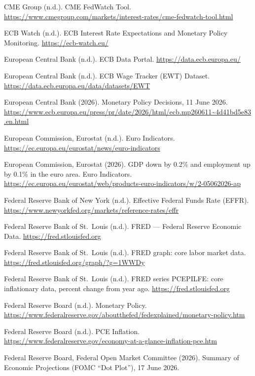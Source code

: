 \documentclass[11pt,a4paper]{article}
\begin{document}
\begin{fshfreferences}
\expandafter\def\expandafter\UrlBreaks\expandafter{\UrlBreaks\do\-}
\item CME Group (n.d.). CME FedWatch Tool. \url{https://www.cmegroup.com/markets/interest-rates/cme-fedwatch-tool.html}
\item ECB Watch (n.d.). ECB Interest Rate Expectations and Monetary Policy Monitoring. \url{https://ecb-watch.eu/}
\item European Central Bank (n.d.). ECB Data Portal. \url{https://data.ecb.europa.eu/}
\item European Central Bank (n.d.). ECB Wage Tracker (EWT) Dataset. \url{https://data.ecb.europa.eu/data/datasets/EWT}
\item European Central Bank (2026). Monetary Policy Decisions, 11 June 2026. \url{https://www.ecb.europa.eu/press/pr/date/2026/html/ecb.mp260611~4d41bd5e83.en.html}
\item European Commission, Eurostat (n.d.). Euro Indicators. \url{https://ec.europa.eu/eurostat/news/euro-indicators}
\item European Commission, Eurostat (2026). GDP down by 0.2\% and employment up by 0.1\% in the euro area. Euro Indicators. \url{https://ec.europa.eu/eurostat/web/products-euro-indicators/w/2-05062026-ap}
\item Federal Reserve Bank of New York (n.d.). Effective Federal Funds Rate (EFFR). \url{https://www.newyorkfed.org/markets/reference-rates/effr}
\item Federal Reserve Bank of St.\ Louis (n.d.). FRED --- Federal Reserve Economic Data. \url{https://fred.stlouisfed.org}
\item Federal Reserve Bank of St.\ Louis (n.d.). FRED graph: core labor market data. \url{https://fred.stlouisfed.org/graph/?g=1WWDy}
\item Federal Reserve Bank of St.\ Louis (n.d.). FRED series PCEPILFE: core inflationary data, percent change from year ago. \url{https://fred.stlouisfed.org}
\item Federal Reserve Board (n.d.). Monetary Policy. \url{https://www.federalreserve.gov/aboutthefed/fedexplained/monetary-policy.htm}
\item Federal Reserve Board (n.d.). PCE Inflation. \url{https://www.federalreserve.gov/economy-at-a-glance-inflation-pce.htm}
\item Federal Reserve Board, Federal Open Market Committee (2026). Summary of Economic Projections (FOMC ``Dot Plot''), 17 June 2026.

\end{fshfreferences}
\end{document}
